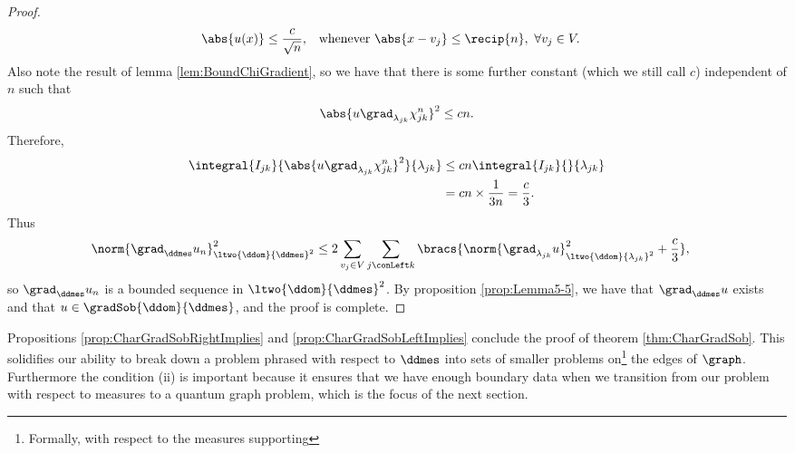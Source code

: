 \begin{proof}
\begin{align*}
		\abs{ u(x) } \leq \frac{c}{\sqrt{n}}, &\quad\text{whenever } \abs{x-v_j}\leq\recip{n}, \ \forall v_j\in V.
	\end{align*}
	Also note the result of lemma \ref{lem:BoundChiGradient}, so we have that there is some further constant (which we still call $c$) independent of $n$ such that
	\begin{align*}
		\abs{u\grad_{\lambda_{jk}}\chi_{jk}^n}^2 \leq cn.
	\end{align*}
	Therefore,
	\begin{align*}
		\integral{I_{jk}}{\abs{ u\grad_{\lambda_{jk}}\chi_{jk}^n }^2}{\lambda_{jk}}
		&\leq cn\integral{I_{jk}}{}{\lambda_{jk}} \\
		&= cn\times\frac{1}{3n} = \frac{c}{3} .
	\end{align*}
	Thus
	\begin{align*}
		\norm{\grad_{\ddmes}u_n}_{\ltwo{\ddom}{\ddmes}^2}^2
		&\leq 2\sum_{v_j\in V}\sum_{j\conLeft k}\bracs{ \norm{\grad_{\lambda_{jk}}u}_{\ltwo{\ddom}{\lambda_{jk}}^2}^2 + \frac{c}{3}},
	\end{align*}
	so $\grad_{\ddmes}u_n$ is a bounded sequence in $\ltwo{\ddom}{\ddmes}^2$.
	By proposition \ref{prop:Lemma5-5}, we have that $\grad_\ddmes u$ exists and that
	$u\in\gradSob{\ddom}{\ddmes}$, and the proof is complete.
\end{proof}

Propositions \ref{prop:CharGradSobRightImplies} and \ref{prop:CharGradSobLeftImplies}  conclude the proof of theorem \ref{thm:CharGradSob}.
This solidifies our ability to break down a problem phrased with respect to $\ddmes$ into sets of smaller problems on\footnote{Formally, with respect to the measures supporting} the edges of $\graph$.
Furthermore the condition (ii) is important because it ensures that we have enough boundary data when we transition from our problem with respect to measures to a quantum graph problem, which is the focus of the next section.

